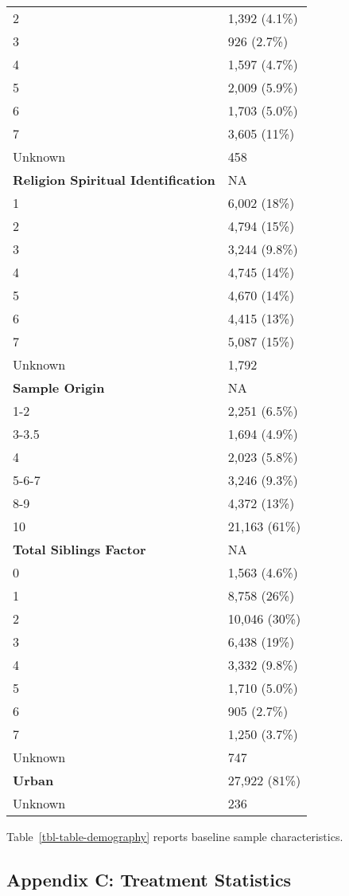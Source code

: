 \documentclass[
  single column]{article}
\begin{document}
\begin{longtable}[]{@{}ll@{}}
2 & 1,392 (4.1\%) \\
3 & 926 (2.7\%) \\
4 & 1,597 (4.7\%) \\
5 & 2,009 (5.9\%) \\
6 & 1,703 (5.0\%) \\
7 & 3,605 (11\%) \\
Unknown & 458 \\
\textbf{Religion Spiritual Identification} & NA \\
1 & 6,002 (18\%) \\
2 & 4,794 (15\%) \\
3 & 3,244 (9.8\%) \\
4 & 4,745 (14\%) \\
5 & 4,670 (14\%) \\
6 & 4,415 (13\%) \\
7 & 5,087 (15\%) \\
Unknown & 1,792 \\
\textbf{Sample Origin} & NA \\
1-2 & 2,251 (6.5\%) \\
3-3.5 & 1,694 (4.9\%) \\
4 & 2,023 (5.8\%) \\
5-6-7 & 3,246 (9.3\%) \\
8-9 & 4,372 (13\%) \\
10 & 21,163 (61\%) \\
\textbf{Total Siblings Factor} & NA \\
0 & 1,563 (4.6\%) \\
1 & 8,758 (26\%) \\
2 & 10,046 (30\%) \\
3 & 6,438 (19\%) \\
4 & 3,332 (9.8\%) \\
5 & 1,710 (5.0\%) \\
6 & 905 (2.7\%) \\
7 & 1,250 (3.7\%) \\
Unknown & 747 \\
\textbf{Urban} & 27,922 (81\%) \\
Unknown & 236 \\

\end{longtable}

Table~\ref{tbl-table-demography} reports baseline sample
characteristics.

\newpage{}

\subsection{Appendix C: Treatment Statistics}\label{appendix-exposures}
\end{document}
